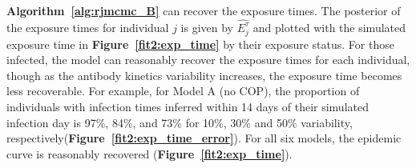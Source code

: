 \paragraph{} \textbf{Algorithm~\ref{alg:rjmcmc_B}} can recover the exposure times. The posterior of the exposure times for individual $j$ is given by $\hat{E^\tau_j}$ and plotted with the simulated exposure time in \textbf{Figure~\ref{fit2:exp_time} } by their exposure status. For those infected, the model can reasonably recover the exposure times for each individual, though as the antibody kinetics variability increases, the exposure time becomes less recoverable. For example, for Model A (no COP), the proportion of individuals with infection times inferred within 14 days of their simulated infection day is 97\%, 84\%, and 73\% for 10\%, 30\% and 50\% variability, respectively(\textbf{Figure~\ref{fit2:exp_time_error}}). For all six models, the epidemic curve is reasonably recovered (\textbf{Figure~\ref{fit2:exp_time}}). 
